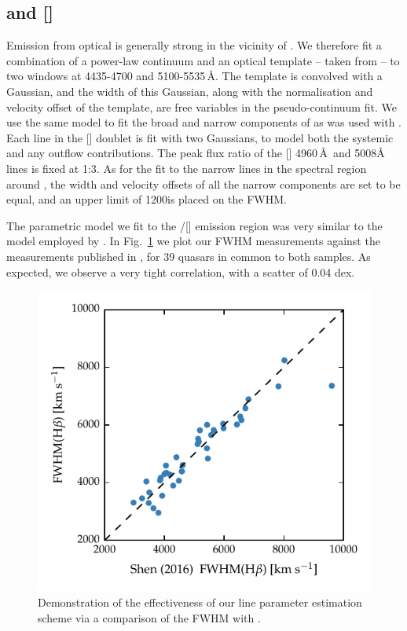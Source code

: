 \subsection{\hb and []}
\label{sec:hb}

Emission from optical  is generally strong in the vicinity of \hbns.
We therefore fit a combination of a power-law continuum and an optical  template -- taken from \citet{boroson92} -- to two windows at 4435-4700 and 5100-5535\,\AA. 
The  template is convolved with a Gaussian, and the width of this Gaussian, along with the normalisation and velocity offset of the  template, are free variables in the pseudo-continuum fit.
We use the same model to fit the broad and narrow components of \hb as was used with \hans. 
Each line in the [] doublet is fit with two Gaussians, to model both the systemic and any outflow contributions. 
The peak flux ratio of the [] 4960\,\AA\, and 5008\AA\, lines is fixed at 1:3. 
As for the fit to the narrow lines in the spectral region around \hans, the width and velocity offsets of all the narrow components are set to be equal, and an upper limit of 1200\kms is placed on the FWHM. 

The parametric model we fit to the \hbns/[] emission region was very similar to the model employed by \citet{shen16a}. 
In Fig.~\ref{fig:shen_comparison_hb} we plot our \hb FWHM measurements against the measurements published in \citet{shen16a}, for 39 quasars in common to both samples. 
As expected, we observe a very tight correlation, with a scatter of 0.04 dex. 

\begin{figure}
    \centering 
    \includegraphics[width=0.8\linewidth]{figures/chapter03/shen_comparison_hb.pdf} 
    \caption{Demonstration of the effectiveness of our line parameter estimation scheme via a comparison of the \hb FWHM with \citet{shen16a}.} 
    \label{fig:shen_comparison_hb}
\end{figure}

